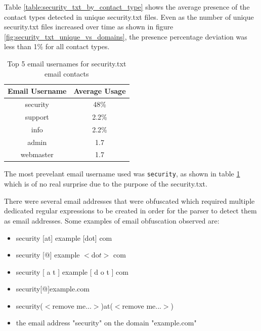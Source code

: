 \documentclass{mscreport}
\begin{document}
\noindent
Table \ref{table:security_txt_by_contact_type} shows the average presence of the contact types detected in unique security.txt files. Even as the number of unique security.txt files increased over time as shown in figure \ref{fig:security_txt_unique_vs_domains}, the presence percentage deviation was less than 1\% for all contact types.

\begin{table}[H]
  \begin{center}
    \begin{tabular}{|c|c|}  %
      \hline
      \textbf{Email Username} & \textbf{Average Usage}\\
      \hline
      security & 48\%\\
      \hline
      support & 2.2\%\\
      \hline
      info & 2.2\%\\
      \hline
      admin & 1.7\\
      \hline
      webmaster & 1.7\\
      \hline
    \end{tabular}
    \caption{Top 5 email usernames for security.txt email contacts}
    \label{table:security_txt_by_email_username} %
  \end{center}
\end{table}

\noindent
The most prevelant email username used was \texttt{security}, as shown in table \ref{table:security_txt_by_email_username} which is of no real surprise due to the purpose of the security.txt.

\vspace{0.3cm} \noindent
There were several email addresses that were obfuscated which required multiple dedicated regular expressions to be created in order for the parser to detect them as email addresses. Some examples of email obfuscation observed are:

\begin{itemize}
	\setlength\itemsep{0.01em}
    \item security [at] example [dot] com
    \item security [@] example $<$do$t>$ com
    \item security [ a t ] example [ d o t ] com
    \item security[@]example.com
    \item security($<$remove me...$>$)at($<$remove me...$>$)
    \item the email address "security" on the domain "example.com"
\end{itemize}
\end{document}
